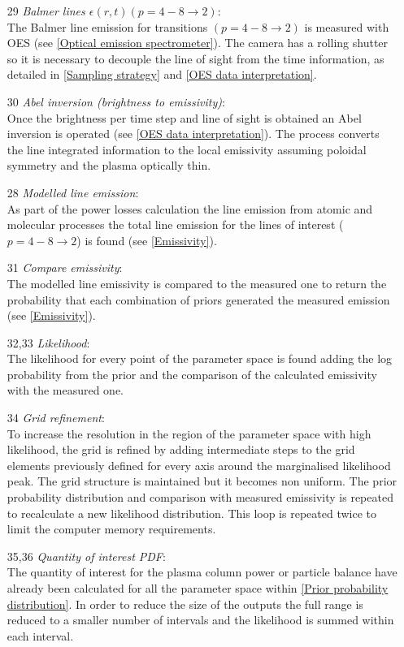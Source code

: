 \begin{enumerate}
    \item[29] \emph{Balmer lines $\epsilon(r,t)(p=4-8\rightarrow 2)$}: \\The Balmer line emission for transitions $(p=4-8\rightarrow 2)$ is measured with OES (see \autoref{Optical emission spectrometer}). The camera has a rolling shutter so it is necessary to decouple the line of sight from the time information, as detailed in \autoref{Sampling strategy} and \ref{OES data interpretation}.
    \item[30] \emph{Abel inversion (brightness to emissivity)}: \\Once the brightness per time step and line of sight is obtained an Abel inversion is operated (see \autoref{OES data interpretation}). The process converts the line integrated information to the local emissivity assuming poloidal symmetry and the plasma optically thin.
    \item[28] \emph{Modelled line emission}: \\As part of the power losses calculation the line emission from atomic and molecular processes the total line emission for the lines of interest ($p=4-8 \rightarrow 2$) is found (see \autoref{Emissivity}).
    \item[31] \emph{Compare emissivity}: \\The modelled line emissivity is compared to the measured one to return the probability that each combination of priors generated the measured emission (see \autoref{Emissivity}).
    \item[32,33] \emph{Likelihood}: \\The likelihood for every point of the parameter space is found adding the log probability from the prior and the comparison of the calculated emissivity with the measured one.
    \item[34] \emph{Grid refinement}: \\To increase the resolution in the region of the parameter space with high likelihood, the grid is refined by adding intermediate steps to the grid elements previously defined for every axis around the marginalised likelihood peak. The grid structure is maintained but it becomes non uniform. The prior probability distribution and comparison with measured emissivity is repeated to recalculate a new likelihood distribution. This loop is repeated twice to limit the computer memory requirements.
    \item[35,36] \emph{Quantity of interest PDF}: \\The quantity of interest for the plasma column power or particle balance have already been calculated for all the parameter space within \autoref{Prior probability distribution}. In order to reduce the size of the outputs the full range is reduced to a smaller number of intervals and the likelihood is summed within each interval.
\end{enumerate}


